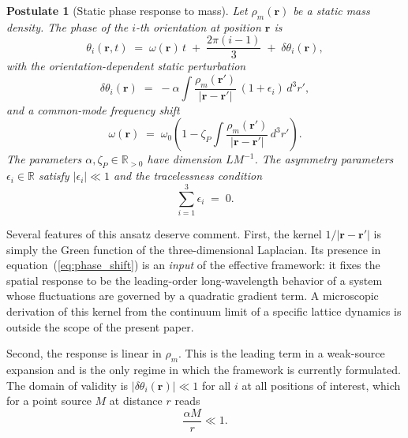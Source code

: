\documentclass[pdflatex,sn-mathphys-num]{sn-jnl}%
\theoremstyle{thmstyleone}%
\theoremstyle{thmstyletwo}%
\theoremstyle{thmstylethree}%
\newtheorem{postulate}{Postulate}%
\begin{document}
\begin{postulate}[Static phase response to mass]
\label{post:response}
Let $\rho_m(\mathbf{r})$ be a static mass density. The
phase of the $i$-th orientation at position $\mathbf{r}$ is
\begin{equation}
    \theta_i(\mathbf{r},t)
    \;=\;
    \omega(\mathbf{r})\,t
    \;+\;
    \frac{2\pi(i-1)}{3}
    \;+\;
    \delta\theta_i(\mathbf{r}),
    \label{eq:total_phase}
\end{equation}
with the orientation-dependent static perturbation
\begin{equation}
    \delta\theta_i(\mathbf{r})
    \;=\;
    -\alpha\int
    \frac{\rho_m(\mathbf{r}')}{|\mathbf{r}-\mathbf{r}'|}
    \,(1+\epsilon_i)\,d^3r',
    \label{eq:phase_shift}
\end{equation}
and a common-mode frequency shift
\begin{equation}
    \omega(\mathbf{r})
    \;=\;
    \omega_0
    \!\left(
      1-\zeta_P
      \int\frac{\rho_m(\mathbf{r}')}{|\mathbf{r}-\mathbf{r}'|}
      \,d^3r'
    \right).
    \label{eq:freq_shift}
\end{equation}
The parameters $\alpha,\zeta_P\in\mathbb{R}_{>0}$ have
dimension $LM^{-1}$. The asymmetry parameters
$\epsilon_i\in\mathbb{R}$ satisfy $|\epsilon_i|\ll 1$ and the
tracelessness condition
\begin{equation}
    \sum_{i=1}^{3}\epsilon_i \;=\; 0.
    \label{eq:trace_constraint}
\end{equation}
\end{postulate}

Several features of this ansatz deserve comment. First, the
kernel $1/|\mathbf{r}-\mathbf{r}'|$ is simply the Green function of the
three-dimensional Laplacian. Its presence in
equation~(\ref{eq:phase_shift}) is an \emph{input} of the
effective framework: it fixes the spatial response to be the
leading-order long-wavelength behavior of a system whose
fluctuations are governed by a quadratic gradient term. A
microscopic derivation of this kernel from the continuum limit
of a specific lattice dynamics is outside the scope of the
present paper.

Second, the response is linear in $\rho_m$. This is the
leading term in a weak-source expansion and is the only regime
in which the framework is currently formulated. The
domain of validity is $|\delta\theta_i(\mathbf{r})|\ll 1$ for
all $i$ at all positions of interest, which for a point source
$M$ at distance $r$ reads
\begin{equation}
\frac{\alpha M}{r}\ll 1.
\label{eq:domain}
\end{equation}
\end{document}
